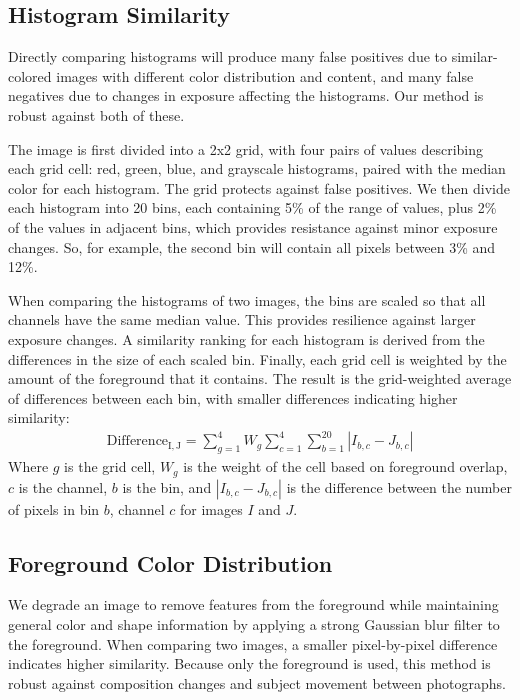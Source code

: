 \documentclass{sig-alternate}
\begin{document}
\subsection{Histogram Similarity}
Directly comparing histograms will produce many false positives due to similar-colored images with different color distribution and content, and many false negatives due to changes in exposure affecting the histograms. Our method is robust against both of these.

The image is first divided into a 2x2 grid, with four pairs of values describing each grid cell: red, green, blue, and grayscale histograms, paired with the median color for each histogram. The grid protects against false positives. We then divide each histogram into 20 bins, each containing 5\% of the range of values, plus 2\% of the values in adjacent bins, which provides resistance against minor exposure changes. So, for example, the second bin will contain all pixels between 3\% and 12\%.

When comparing the histograms of two images, the bins are scaled so that all channels have the same median value. This provides resilience against larger exposure changes. A similarity ranking for each histogram is derived from the differences in the size of each scaled bin. Finally, each grid cell is weighted by the amount of the foreground that it contains. The result is the grid-weighted average of differences between each bin, with smaller differences indicating higher similarity:
\begin{eqnarray}
\mathrm{Difference_{I,J}}=\displaystyle\sum\limits_{g=1}^4W_g\sum\limits_{c=1}^4\sum\limits_{b=1}^{20} |I_{b,c} - J_{b,c}|
\end{eqnarray}
Where \(g\) is the grid cell, \(W_g\) is the weight of the cell based on foreground overlap, \(c\) is the channel, \(b\) is the bin, and \(|I_{b,c}-J_{b,c}|\) is the difference between the number of pixels in bin \(b\), channel \(c\) for images \(I\) and \(J\).

\subsection{Foreground Color Distribution}
We degrade an image to remove features from the foreground while maintaining general color and shape information by applying a strong Gaussian blur filter to the foreground. When comparing two images, a smaller pixel-by-pixel difference indicates higher similarity. Because only the foreground is used, this method is robust against composition changes and subject movement between photographs.
\end{document}
